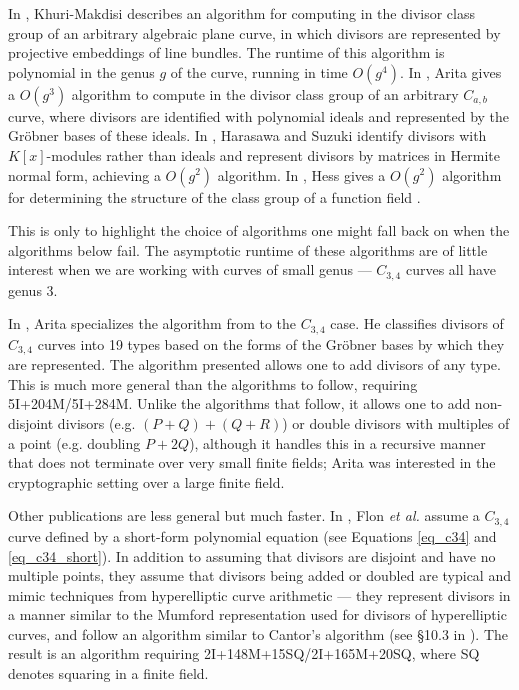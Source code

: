 In \cite{kmakdisi04}, Khuri-Makdisi describes an algorithm for computing in the divisor class group of an arbitrary algebraic plane curve,
in which divisors are represented by projective embeddings of line bundles.
The runtime of this algorithm is polynomial in the genus $g$ of the curve, running in time $O(g^4)$.
In \cite{arita99}, Arita gives a $O(g^3)$ algorithm to compute in the divisor class group of an arbitrary $C_{a,b}$ curve,
where divisors are identified with polynomial ideals and represented by the Gr\"obner bases of these ideals.
In \cite{harasawa00}, Harasawa and Suzuki identify divisors with $K[x]$-modules rather than ideals and represent divisors by matrices in Hermite normal form,
achieving a $O(g^2)$ algorithm.
In \cite{hess99}, Hess gives a $O(g^2)$ algorithm for determining the structure of the class group of a function field 
.

This is only to highlight the choice of algorithms one might fall back on when the algorithms below fail.
The asymptotic runtime of these algorithms are of little interest when we are working with curves of small genus ---
$C_{3,4}$ curves all have genus 3.

In \cite{arita05-2}, Arita specializes the algorithm from \cite{arita99} to the $C_{3,4}$ case.
He classifies divisors of $C_{3,4}$ curves into 19 types based on the forms of the Gr\"obner bases by which they are represented.
The algorithm presented allows one to add divisors of any type.
This is much more general than the algorithms to follow, requiring 5I+204M/5I+284M.
Unlike the algorithms that follow, it allows one to add non-disjoint divisors (e.g. $(P + Q) + (Q + R)$)
or double divisors with multiples of a point (e.g. doubling $P + 2Q$),
although it handles this in a recursive manner that does not terminate over very small finite fields;
Arita was interested in the cryptographic setting over a large finite field.

Other publications are less general but much faster.
In \cite{flon08}, Flon \emph{et al.} assume a $C_{3,4}$ curve defined by a short-form polynomial equation
(see Equations \ref{eq_c34} and \ref{eq_c34_short}).
In addition to assuming that divisors are disjoint and have no multiple points, 
they assume that divisors being added or doubled are typical and mimic techniques from hyperelliptic curve arithmetic ---
they represent divisors in a manner similar to the Mumford representation used for divisors of hyperelliptic curves,
and follow an algorithm similar to Cantor's algorithm (see \S 10.3 in \cite{galbraith12}).
The result is an algorithm requiring 2I+148M+15SQ/2I+165M+20SQ, where SQ denotes squaring in a finite field.

